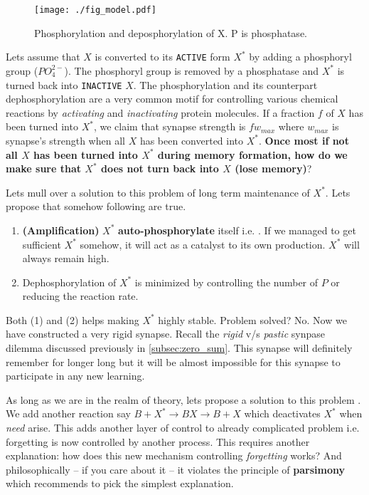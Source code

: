 \documentclass[]{resonance}
\begin{document}
\begin{figure}[h!]
    \caption{Phosphorylation and deposphorylation of X. P is phosphatase.}\label{fig:model}
    \texttt{[image: ./fig\_model.pdf]}
\end{figure}

Lets assume that $X$ is converted to its \texttt{ACTIVE} form $X^*$  by adding a
phosphoryl group ($PO_4^{2-}$). The phosphoryl group is removed by a phosphatase
and $X^*$ is turned back into \texttt{INACTIVE} $X$. The phosphorylation and its
counterpart dephosphorylation are a very common motif for controlling various
chemical reactions by \textit{activating} and \textit{inactivating} protein
molecules. If a fraction $f$ of $X$ has been turned into $X^*$, we claim that
synapse strength is $fw_{max}$ where $w_{max}$ is synapse's  strength when all
$X$ has been converted into $X^*$. \textbf{Once most if not all $X$ has been
turned into $X^*$ during memory formation, how do we make sure that $X^*$
does not turn back into $X$ (lose memory)}?

Lets mull over a solution to this problem of long term maintenance of $X^*$.
Lets propose that somehow following are true. 
\begin{enumerate}
    \item \textbf{(Amplification)} $X^*$ \textbf{auto-phosphorylate} itself i.e. . If we managed to get sufficient $X^*$ somehow, it
        will act as a catalyst to its own production. $X^*$ will always remain
        high.
    \item Dephosphorylation of $X^*$ is minimized by controlling the number of
        $P$ or reducing the reaction rate.
\end{enumerate} 

Both (1) and (2) helps making $X^*$ highly stable. Problem solved? No.  Now we
have constructed a very rigid synapse. Recall the \textit{rigid} v/s
\textit{pastic} synpase dilemma discussed previously in \ref{subsec:zero_sum}.
This synapse will definitely remember for longer long but it will be almost
impossible for this synapse to participate in any new learning.

As long as we are in the realm of theory, lets propose a solution to this
problem . We add another reaction say $B+X^*\rightarrow BX \rightarrow B+X$
which deactivates $X^*$ when \textit{need} arise. This adds another layer of
control to already complicated problem i.e. forgetting is now controlled by
another process. This requires another explanation: how does this new mechanism
controlling \textit{forgetting} works? And philosophically -- if you care about
it -- it violates the principle of \textbf{parsimony} which recommends to pick
the simplest explanation.
\end{document}
